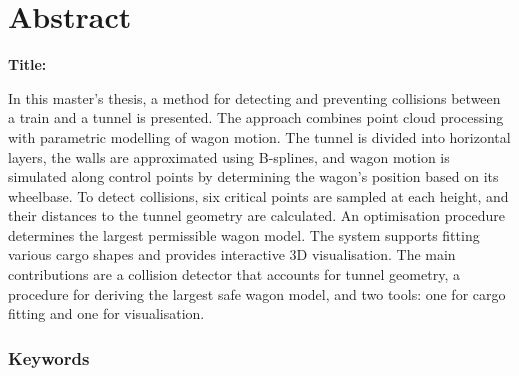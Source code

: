 \chapter*{Abstract}

\noindent\textbf{Title:} \ttitleEn
\bigskip

In this master's thesis, a method for detecting and preventing collisions between a train and a tunnel is presented. The approach combines point cloud processing with parametric modelling of wagon motion. The tunnel is divided into horizontal layers, the walls are approximated using B-splines, and wagon motion is simulated along control points by determining the wagon's position based on its wheelbase. To detect collisions, six critical points are sampled at each height, and their distances to the tunnel geometry are calculated. An optimisation procedure determines the largest permissible wagon model. The system supports fitting various cargo shapes and provides interactive 3D visualisation. The main contributions are a collision detector that accounts for tunnel geometry, a procedure for deriving the largest safe wagon model, and two tools: one for cargo fitting and one for visualisation.


\subsection*{Keywords}
\textit{\tkeywordsEn}
\clearemptydoublepage